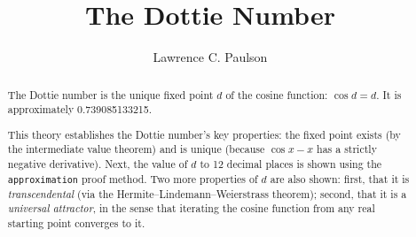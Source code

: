 \documentclass[11pt,a4paper]{article}
\begin{document}
\title{The Dottie Number}
\author{Lawrence C. Paulson}
\maketitle

\begin{abstract}
The Dottie number is the unique fixed point $d$ of the cosine function:
$\cos d = d$. It is approximately 0.739085133215.

This theory establishes the Dottie number's key properties: the
fixed point exists (by the intermediate value theorem) and is unique
(because $\cos x - x$ has a strictly negative derivative). Next, the
value of $d$ to 12 decimal places is shown using the \texttt{approximation} proof
method. Two more properties of $d$ are also shown: first, that it is
\emph{transcendental} (via the Hermite--Lindemann--Weierstrass theorem); second,
that it is a \emph{universal attractor}, in the sense that iterating the cosine
function from any real starting point converges to it.
\end{abstract}

\tableofcontents

\newpage





\end{document}
